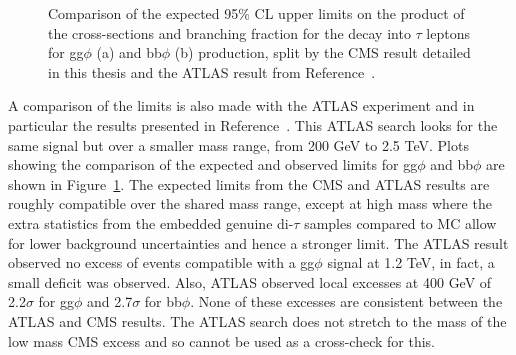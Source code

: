 \begin{figure}[!hbtp]
\centering
\caption[Plots of the comparison of the model-independent limits between CMS and ATLAS.]{Comparison of the expected 95\% CL upper limits on the product of the cross-sections and branching fraction for the decay into $\tau$ leptons for gg$\phi$ (a) and bb$\phi$ (b) production, split by the CMS result detailed in this thesis and the ATLAS result from Reference~\cite{ATLAS:2020zms}.}
\label{fig:model_independent_limits_ATLAS}
\end{figure}

A comparison of the limits is also made with the ATLAS experiment and in particular the results presented in Reference~\cite{ATLAS:2020zms}.
This ATLAS search looks for the same signal but over a smaller mass range, from 200 GeV to 2.5 TeV.
Plots showing the comparison of the expected and observed limits for gg$\phi$ and bb$\phi$ are shown in Figure~\ref{fig:model_independent_limits_ATLAS}.
The expected limits from the \ac{CMS} and ATLAS results are roughly compatible over the shared mass range, except at high mass where the extra statistics from the embedded genuine di-$\tau$ samples compared to \ac{MC} allow for lower background uncertainties and hence a stronger limit.
The ATLAS result observed no excess of events compatible with a gg$\phi$ signal at 1.2 TeV, in fact, a small deficit was observed.
Also, ATLAS observed local excesses at 400 GeV of 2.2$\sigma$ for gg$\phi$ and 2.7$\sigma$ for bb$\phi$.
None of these excesses are consistent between the ATLAS and \ac{CMS} results.
The ATLAS search does not stretch to the mass of the low mass \ac{CMS} excess and so cannot be used as a cross-check for this.


